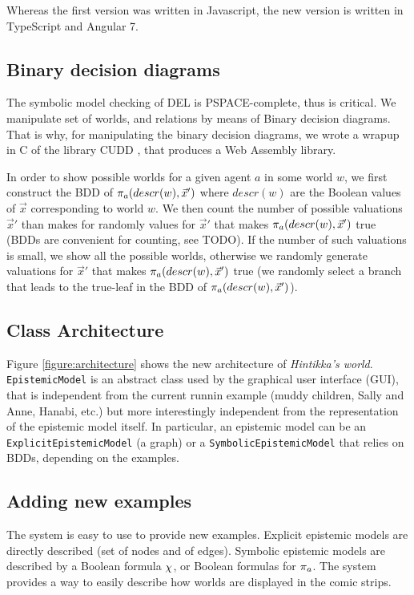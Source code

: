 
Whereas the first version was written in Javascript, the new version is written in TypeScript and Angular 7.

\subsection{Binary decision diagrams}

The symbolic model checking of DEL is PSPACE-complete, thus is critical. We manipulate set of worlds, and relations by means of Binary decision diagrams. That is why, for manipulating the binary decision diagrams, we wrote a wrapup in C of the library CUDD \cite{}, that produces a Web Assembly library.

In order to show possible worlds for a given agent $a$ in some world $w$, we first construct the BDD of $\pi_{a}(descr(w), \vec x')$ where $descr(w)$ are the Boolean values of $\vec x$ corresponding to world $w$. We then count the number of possible valuations $\vec x'$ than makes for randomly values for $\vec x'$ that makes $\pi_{a}(descr(w), \vec x')$ true (BDDs are convenient for counting, see TODO). If the number of such valuations is small, we show all the possible worlds, otherwise we randomly generate valuations for $\vec x'$ that makes $\pi_{a}(descr(w), \vec x')$ true (we randomly select a branch that leads to the true-leaf in the BDD of $\pi_{a}(descr(w), \vec x')$).

\subsection{Class Architecture}

Figure \ref{figure:architecture} shows the new architecture of \emph{Hintikka's world}. \texttt{EpistemicModel} is an abstract class used by the graphical user interface (GUI), that is independent from the current runnin example (muddy children, Sally and Anne, Hanabi, etc.) but more interestingly independent from the representation of the epistemic model itself. In particular, an epistemic model can be an \texttt{ExplicitEpistemicModel} (a graph) or a \texttt{SymbolicEpistemicModel} that relies on BDDs, depending on the examples.


\subsection{Adding new examples}

The system is easy to use to provide new examples. Explicit epistemic models are directly described (set of nodes and of edges). Symbolic epistemic models are described by a Boolean formula $\chi$, or Boolean formulas for $\pi_{a}$. The system provides a way to easily describe how worlds are displayed in the comic strips.


